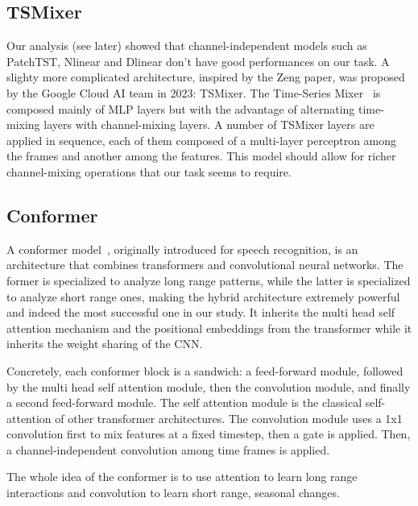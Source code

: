 \documentclass[
reprint,
aps,
prd,
superscriptaddress,
nofootinbib
]{revtex4-2}
\begin{document}
\subsection{TSMixer}

Our analysis (see later) showed that channel-independent models such as PatchTST, Nlinear and Dlinear don't have good performances on our task. A slighty more complicated architecture, inspired by the Zeng paper, was proposed by the Google Cloud AI team in 2023: TSMixer.
The Time-Series Mixer~\cite{chen2023tsmixerallmlparchitecturetime} is composed mainly of MLP layers but with the advantage of alternating time-mixing layers with channel-mixing layers. A number of TSMixer layers are applied in sequence, each of them composed of a multi-layer perceptron among the frames and another among the features. This model should allow for richer channel-mixing operations that our task seems to require. 




\subsection{Conformer}

A conformer model~\cite{gulati2020conformerconvolutionaugmentedtransformerspeech}, originally introduced for speech recognition, is an architecture that combines transformers and convolutional neural networks. The former is specialized to analyze long range patterns, while the latter is specialized to analyze short range ones, making the hybrid architecture extremely powerful and indeed the most successful one in our study. It inherits the multi head self attention mechanism and the positional embeddings from the transformer while it inherits the weight sharing of the CNN.

Concretely, each conformer block is a sandwich: a feed-forward module, followed by the multi head self attention module, then the convolution module, and finally a second feed-forward module. 
The self attention module is the classical self-attention of other transformer architectures. The convolution module uses a 1x1 convolution first to mix features at a fixed timestep, then a gate is applied. Then, a channel-independent convolution among time frames is applied.

The whole idea of the conformer is to use attention to learn long range interactions and convolution to learn short range, seasonal changes.
\end{document}

